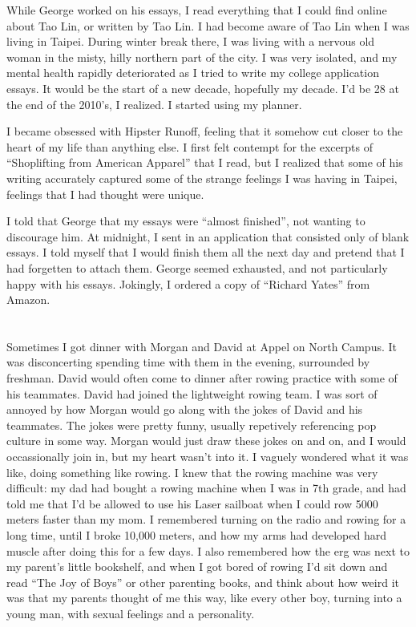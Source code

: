 While George worked on his essays, I read everything that I could find online
about Tao Lin, or written by Tao Lin.  I had become aware of  Tao Lin when I was
living in Taipei.  During winter break there, I was living with a nervous old
woman in the misty, hilly northern part of the city.  I was very isolated, and
my mental health rapidly deteriorated as I tried to write my college application
essays.  It would be the start of a new decade, hopefully my decade.  I'd be 28
at the end of the 2010's, I realized.  I started using my planner.

I became obsessed with Hipster Runoff, feeling that it somehow cut closer to the
heart of my life than anything else.  I first felt contempt for the excerpts of
``Shoplifting from American Apparel'' that I read, but I realized that some of his
writing accurately captured some of the strange feelings I was having in Taipei,
feelings that I had thought were unique.

I told that George that my essays were ``almost finished'', not wanting to
discourage him.  At midnight, I sent in an application that consisted only of
blank essays.  I told myself that I would finish them all the next day and
pretend that I had forgetten to attach them.  George seemed exhausted, and not
particularly happy with his essays.  Jokingly, I ordered a copy of ``Richard
Yates'' from Amazon.

\section{}

Sometimes I got dinner with Morgan and David at Appel on North Campus.  It was
disconcerting spending time with them in the evening, surrounded by freshman.
David would often come to dinner after rowing practice with some of his
teammates.  David had joined the lightweight rowing team.  I was sort of annoyed
by how Morgan would go along with the jokes of David and his teammates.  The
jokes were pretty funny, usually repetively referencing pop culture in some way.
Morgan would just draw these jokes on and on, and I would occassionally join in,
but my heart wasn't into it.  I vaguely wondered what it was like, doing
something like rowing.  I knew that the rowing machine was very difficult: my
dad had bought a rowing machine when I was in 7th grade, and had told me that
I'd be allowed to use his Laser sailboat when I could row 5000 meters faster
than my mom.  I remembered turning on the radio and rowing for a long time,
until I broke 10,000 meters, and how my arms had developed hard muscle after
doing this for a few days.  I also remembered how the erg was next to my
parent's little bookshelf, and when I got bored of rowing I'd sit down and read
``The Joy of Boys'' or other parenting books, and think about how weird it was
that my parents thought of me this way, like every other boy, turning into a
young man, with sexual feelings and a personality.  

